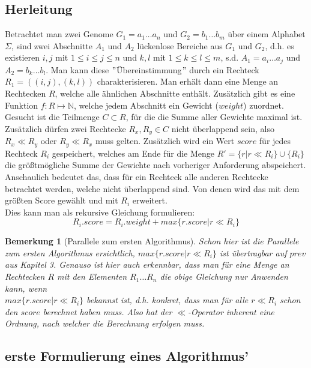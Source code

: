 \subsection{Herleitung}
Betrachtet man zwei Genome $G_1=a_1\dots a_n$ und $G_2=b_1\dots b_m$ über einem Alphabet $\Sigma$, sind zwei Abschnitte $A_1$ und $A_2$ lückenlose Bereiche aus $G_1$ und $G_2$, d.h. es existieren $i,j$ mit $1\leq i \leq j \leq n$ und $k,l$ mit $1\leq k \leq l \leq m$, s.d. $A_1 = a_i\dots a_j$ und $A_2 =b_k \dots b_l$. Man kann diese $"$Übereinstimmung$"$ durch ein Rechteck $R_1=((i,j),(k,l))$ charakterisieren. Man erhält dann eine Menge an Rechtecken $R$, welche alle ähnlichen Abschnitte enthält. Zusätzlich gibt es eine Funktion $f:R \mapsto \mathbb{N}$, welche jedem Abschnitt ein Gewicht ($weight$) zuordnet. Gesucht ist die Teilmenge $C \subset R$, für die die Summe aller Gewichte maximal ist. Zusätzlich dürfen zwei Rechtecke $R_x,R_y \in C$ nicht überlappend sein, also $R_x \ll R_y$ oder $R_y \ll R_x$ muss gelten. Zusätzlich wird ein Wert $score$ für jedes Rechteck $R_i$ gespeichert, welches am Ende für die Menge $R'=\{r | r \ll R_i\} \cup \{R_i\}$ die größtmögliche Summe der Gewichte nach vorheriger Anforderung abspeichert. Anschaulich bedeutet das, dass für ein Rechteck alle anderen Rechtecke betrachtet werden, welche nicht überlappend sind. Von denen wird das mit dem größten Score gewählt und mit $R_i$ erweitert.\\
Dies kann man als rekursive Gleichung formulieren:
\[ R_i.score =  R_i.weight + max\{r.score | r \ll R_i\}\]

\newtheorem{bemerkung}{Bemerkung}
\begin{bemerkung}[Parallele zum ersten Algorithmus]
Schon hier ist die Parallele zum ersten Algorithmus ersichtlich, $max\{r.score | r \ll R_i\}$ ist übertragbar auf $prev$ aus Kapitel 3. Genauso ist hier auch erkennbar, dass man für eine Menge an Rechtecken $R$ mit den Elementen $R_1 \dots R_n$ die obige Gleichung nur Anwenden kann, wenn\\ $max\{r.score | r\ll R_i\}$ bekannst ist, d.h. konkret, dass man für alle $r \ll R_i$ schon den $score$ berechnet haben muss. Also hat der $\ll$-Operator inherent eine Ordnung, nach welcher die Berechnung erfolgen muss. 
\end{bemerkung}


\subsection{erste Formulierung eines Algorithmus'}

